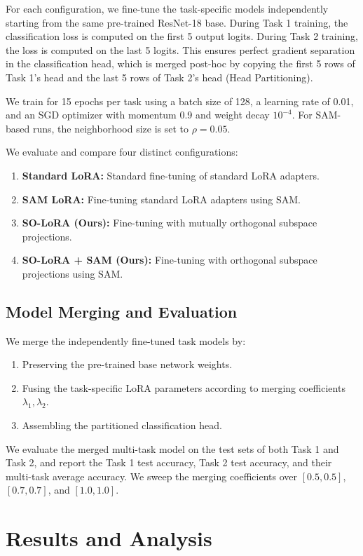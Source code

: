 \documentclass{article}
\theoremstyle{plain}
\theoremstyle{definition}
\theoremstyle{remark}
\begin{document}
For each configuration, we fine-tune the task-specific models independently starting from the same pre-trained ResNet-18 base. 
During Task 1 training, the classification loss is computed on the first 5 output logits. During Task 2 training, the loss is computed on the last 5 logits. This ensures perfect gradient separation in the classification head, which is merged post-hoc by copying the first 5 rows of Task 1's head and the last 5 rows of Task 2's head (Head Partitioning).

We train for 15 epochs per task using a batch size of 128, a learning rate of 0.01, and an SGD optimizer with momentum 0.9 and weight decay $10^{-4}$. For SAM-based runs, the neighborhood size is set to $\rho=0.05$.

We evaluate and compare four distinct configurations:
\begin{enumerate}
  \item \textbf{Standard LoRA:} Standard fine-tuning of standard LoRA adapters.
  \item \textbf{SAM LoRA:} Fine-tuning standard LoRA adapters using SAM.
  \item \textbf{SO-LoRA (Ours):} Fine-tuning with mutually orthogonal subspace projections.
  \item \textbf{SO-LoRA + SAM (Ours):} Fine-tuning with orthogonal subspace projections using SAM.
\end{enumerate}

\subsection{Model Merging and Evaluation}

We merge the independently fine-tuned task models by:
\begin{enumerate}
  \item Preserving the pre-trained base network weights.
  \item Fusing the task-specific LoRA parameters according to merging coefficients $\lambda_1, \lambda_2$.
  \item Assembling the partitioned classification head.
\end{enumerate}
We evaluate the merged multi-task model on the test sets of both Task 1 and Task 2, and report the Task 1 test accuracy, Task 2 test accuracy, and their multi-task average accuracy. We sweep the merging coefficients over $[0.5, 0.5]$, $[0.7, 0.7]$, and $[1.0, 1.0]$.

\section{Results and Analysis}
\label{results}
\end{document}
